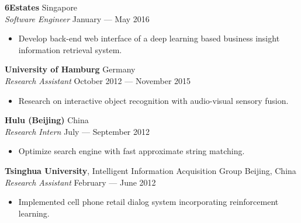 \documentclass[a4paper,9pt]{extarticle} %
\begin{document}

\textbf{6Estates}  \hfill Singapore \\
\textit{Software Engineer} \hfill January --- May 2016%
\vspace{-.9\parskip}
\begin{itemize}
  \item Develop back-end web interface of a deep learning based business insight information retrieval system.
\end{itemize}


\textbf{University of Hamburg} \hfill Germany \\
\textit{Research Assistant}  \hfill October 2012 --- November 2015%
\vspace{-.9\parskip}
\begin{itemize}
  \item Research on interactive object recognition with audio-visual sensory fusion.
\end{itemize}


\textbf{Hulu (Beijing)} \hfill China \\
\textit{Research Intern} \hfill July --- September 2012%
\vspace{-.9\parskip}
\begin{itemize}
  \item Optimize search engine with fast approximate string matching.
\end{itemize}


\iffalse{}

\textbf{Tsinghua University}, Intelligent Information Acquisition Group \hfill Beijing, China \\
\textit{Research Assistant} \hfill February --- June 2012
\vspace{-\parskip}
\begin{itemize}
  \item Implemented cell phone retail dialog system incorporating reinforcement learning.
\end{itemize}
\end{document}
